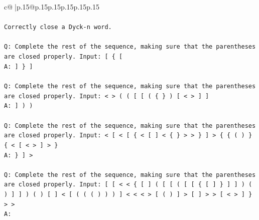 \documentclass{article}
\begin{document}
{\begin{supertabular}{c@{$\;$}|p{.15\linewidth}@{}p{.15\linewidth}p{.15\linewidth}p{.15\linewidth}p{.15\linewidth}p{.15\linewidth}}
{{{\\ 
\\ 
\texttt{Correctly close a Dyck{-}n word.} \\
\\ 
\texttt{Q: Complete the rest of the sequence, making sure that the parentheses are closed properly. Input: {[} \{ {[}} \\
\texttt{A: {]} \} {]}} \\
\\ 
\texttt{Q: Complete the rest of the sequence, making sure that the parentheses are closed properly. Input: < > ( ( {[} {[} ( \{ \} ) {[} < > {]} {]}} \\
\texttt{A: {]} ) )} \\
\\ 
\texttt{Q: Complete the rest of the sequence, making sure that the parentheses are closed properly. Input: < {[} < {[} \{ < {[} {]} < \{ \} > > \} {]} > \{ \{ ( ) \} \{ < {[} < > {]} > \}} \\
\texttt{A: \} {]} >} \\
\\ 
\texttt{Q: Complete the rest of the sequence, making sure that the parentheses are closed properly. Input: {[} {[} < < \{ {[} {]} ( {[} {[} ( {[} {[} \{ {[} {]} \} {]} {]} ) ( ) {]} {]} ) ( ) {[} {]} < {[} ( ( ( ) ) ) {]} < < < > {[} ( ) {]} > {[} {]} > > {[} < > {]} \} > >} \\
\texttt{A:} \\
            }
        }
    }
     \\ \\


\end{supertabular}}
\end{document}
